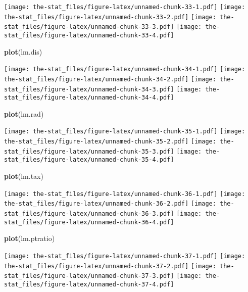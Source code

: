 \documentclass[
]{article}
\newenvironment{Shaded}{\begin{snugshade}}{\end{snugshade}}
\newcommand{\FunctionTok}[1]{\textcolor[rgb]{0.13,0.29,0.53}{\textbf{#1}}}
\newcommand{\NormalTok}[1]{#1}
\begin{document}
\texttt{[image: the-stat\_files/figure-latex/unnamed-chunk-33-1.pdf]}
\texttt{[image: the-stat\_files/figure-latex/unnamed-chunk-33-2.pdf]}
\texttt{[image: the-stat\_files/figure-latex/unnamed-chunk-33-3.pdf]}
\texttt{[image: the-stat\_files/figure-latex/unnamed-chunk-33-4.pdf]}

\begin{Shaded}
\begin{Highlighting}[]
\FunctionTok{plot}\NormalTok{(lm.dis)}
\end{Highlighting}
\end{Shaded}

\texttt{[image: the-stat\_files/figure-latex/unnamed-chunk-34-1.pdf]}
\texttt{[image: the-stat\_files/figure-latex/unnamed-chunk-34-2.pdf]}
\texttt{[image: the-stat\_files/figure-latex/unnamed-chunk-34-3.pdf]}
\texttt{[image: the-stat\_files/figure-latex/unnamed-chunk-34-4.pdf]}

\begin{Shaded}
\begin{Highlighting}[]
\FunctionTok{plot}\NormalTok{(lm.rad)}
\end{Highlighting}
\end{Shaded}

\texttt{[image: the-stat\_files/figure-latex/unnamed-chunk-35-1.pdf]}
\texttt{[image: the-stat\_files/figure-latex/unnamed-chunk-35-2.pdf]}
\texttt{[image: the-stat\_files/figure-latex/unnamed-chunk-35-3.pdf]}
\texttt{[image: the-stat\_files/figure-latex/unnamed-chunk-35-4.pdf]}

\begin{Shaded}
\begin{Highlighting}[]
\FunctionTok{plot}\NormalTok{(lm.tax)}
\end{Highlighting}
\end{Shaded}

\texttt{[image: the-stat\_files/figure-latex/unnamed-chunk-36-1.pdf]}
\texttt{[image: the-stat\_files/figure-latex/unnamed-chunk-36-2.pdf]}
\texttt{[image: the-stat\_files/figure-latex/unnamed-chunk-36-3.pdf]}
\texttt{[image: the-stat\_files/figure-latex/unnamed-chunk-36-4.pdf]}

\begin{Shaded}
\begin{Highlighting}[]
\FunctionTok{plot}\NormalTok{(lm.ptratio)}
\end{Highlighting}
\end{Shaded}

\texttt{[image: the-stat\_files/figure-latex/unnamed-chunk-37-1.pdf]}
\texttt{[image: the-stat\_files/figure-latex/unnamed-chunk-37-2.pdf]}
\texttt{[image: the-stat\_files/figure-latex/unnamed-chunk-37-3.pdf]}
\texttt{[image: the-stat\_files/figure-latex/unnamed-chunk-37-4.pdf]}
\end{document}
